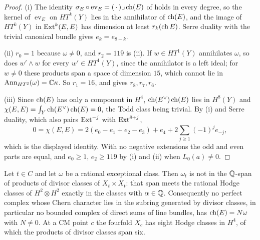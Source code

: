 \begin{proof}
(i) The identity $\sigma_{E}\circ\operatorname{ev}_{E}=(\,\cdot\,)\lrcorner
\operatorname{ch}(E)$ of  holds in every degree, so the kernel of
$\operatorname{ev}_{E}$ on $HT^{k}(Y)$ lies in the annihilator of $\operatorname{ch}(E)$,
and the image of $HT^{k}(Y)$ in $\operatorname{Ext}^{k}(E,E)$ has dimension at least
$r_{k}(\operatorname{ch} E)$. Serre duality with the trivial canonical bundle gives
$e_{k}=e_{8-k}$.

(ii) $r_{0}=1$ because $\omega\ne0$, and $r_{2}=119$ is
(ii). If $w\in HT^{1}(Y)$ annihilates $\omega$, so does
$w'\wedge w$ for every $w'\in HT^{1}(Y)$, since the annihilator is a left
ideal; for $w\ne0$ these products span a space of dimension $15$, which cannot
lie in $\operatorname{Ann}_{HT^{2}}(\omega)=\mathbb{C}\kappa$. So $r_{1}=16$, and
 gives $r_{8},r_{7},r_{6}$.

(iii) Since $\operatorname{ch}(E)$ has only a component in $H^{4}$, $\operatorname{ch}(E^{\vee})\operatorname{ch}(E)$
lies in $H^{8}(Y)$ and $\chi(E,E)=\int_{Y}\operatorname{ch}(E^{\vee})\operatorname{ch}(E)=0$, the Todd
class being trivial. By (i) and Serre duality, which also pairs
$\operatorname{Ext}^{-j}$ with $\operatorname{Ext}^{8+j}$,
\[
  0=\chi(E,E)=2(e_{0}-e_{1}+e_{2}-e_{3})+e_{4}
  +2\sum_{j\ge1}(-1)^{j}e_{-j},
\]
which is the displayed identity. With no negative extensions the odd and even
parts are equal, and $e_{0}\ge1$, $e_{2}\ge119$ by (i) and (ii) when
$L_{0}(a)\ne0$.
\end{proof}

\begin{proposition}
\label{prop:mumforddivisor}
Let $t\in C$ and let $\omega$ be a rational exceptional class. Then $\omega_{t}$
is not in the $\mathbb{Q}$-span of products of divisor classes of $X_{t}\times
X_{t}$: that span meets the rational Hodge classes of $H^{2}\otimes H^{2}$
exactly in the classes with $\alpha\in\mathbb{Q}$. Consequently no perfect complex
whose Chern character lies in the subring generated by divisor classes, in
particular no bounded complex of direct sums of line bundles, has
$\operatorname{ch}(E)=N\omega$ with $N\ne0$. At a CM point $c$ the fourfold $X_{c}$ has eight
Hodge classes in $H^{4}$, of which the products of divisor classes span six.
\end{proposition}

